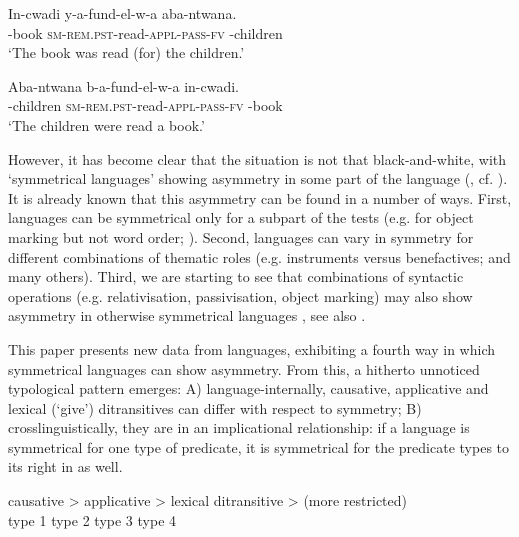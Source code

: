 \documentclass[output=paper]{LSP/langsci}
\begin{document}
\ea\label{ex:vanderwal:2}%
     \ea\label{ex:vanderwal:2a}
\gll In-cwadi  y-a-fund-el-w-a  aba-ntwana.\\
    -book  \textsc{sm}{}-\textsc{rem}.\textsc{pst}{}-read-\textsc{appl}{}-\textsc{pass}{}-\textsc{fv}  -children\\
    \glt ‘The book was read (for) the children.’

 \ex\label{ex:vanderwal:2b}
\gll Aba-ntwana  b-a-fund-el-w-a  in-cwadi.\\
    -children  \textsc{sm}{}-\textsc{rem}.\textsc{pst}{}-read-\textsc{appl}{}-\textsc{pass}{}-\textsc{fv}  -book\\
    \glt ‘The children were read a book.’
\z
\z

However, it has become clear that the situation is not that black-and-white, with ‘symmetrical languages’ showing asymmetry in some part of the language (\citealt{Schadeberg1995}, cf. \citealt{Rugemalira1991,Thwala2006}). It is already known that this asymmetry can be found in a number of ways. First, languages can be symmetrical only for a subpart of the tests (e.g. for object marking but not word order; \citealt{Ngonyani1996,Moshi1998,Riedel2009}). Second, languages can vary in symmetry for different combinations of thematic roles (e.g. instruments versus benefactives; 
\citealt{Baker1988,Marantz1993,AlsinaMchombo1993,Simango1995,Ngonyani1996,Ngonyani1998,ZellerNgoboka2006,Jerro2015} and many others). Third, we are starting to see that combinations of syntactic operations (e.g. relativisation, passivisation, object marking) may also show asymmetry in otherwise symmetrical languages \citep{Adams2010,Zeller2014,HolmbergSheehanvanderWal2015}, see also .

  This paper presents new data from  languages, exhibiting a fourth way in which symmetrical languages can show asymmetry. From this, a hitherto unnoticed typological pattern emerges: A) language-internally, causative, applicative and lexical (‘give’) ditransitives can differ with respect to symmetry; B) crosslinguistically, they are in an implicational relationship: if a language is symmetrical for one type of predicate, it is symmetrical for the predicate types to its right in  as well.

\ea\label{ex:vanderwal:3}%
\gll causative >  applicative >  {lexical ditransitive} >  {(more restricted)}\\
{type 1} {} {type 2} {} {type 3} {}  {type 4}\\
\z
\end{document}
